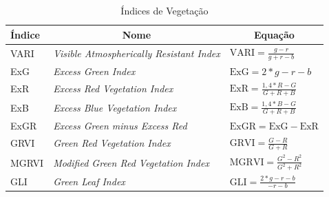 \documentclass[12pt, a4paper, english, brazil]{article}
\begin{document}
\begin{table}[htb]
    \centering
    \caption{Índices de Vegetação \cite{Lu_Zhou_2019}}
    \label{tab:iv}
    \begin{tabular}{@{}lll@{}}
        \toprule
        Índice & \multicolumn{1}{c}{Nome} & \multicolumn{1}{c}{Equação} \\ \midrule

        \multirow{2}{*}{VARI} & \multirow{2}{*}{\textit{Visible Atmospherically Resistant Index}} & \multirow{2}{*}{$\displaystyle \text{VARI} = \frac{g - r}{g + r - b} $} \\
        & & \\ \midrule

        \multirow{2}{*}{ExG} & \multirow{2}{*}{\textit{Excess Green Index}} & \multirow{2}{*}{$\displaystyle \text{ExG} = 2 * g - r - b$} \\
        & & \\ \midrule

        \multirow{2}{*}{ExR} & \multirow{2}{*}{\textit{Excess Red Vegetation Index}} & \multirow{2}{*}{$\displaystyle \text{ExR} = \frac{1,4 * R - G}{G + R + B} $ } \\
        & & \\ \midrule

        \multirow{2}{*}{ExB} & \multirow{2}{*}{\textit{Excess Blue Vegetation Index}} & \multirow{2}{*}{$\displaystyle \text{ExB} = \frac{1,4 * B - G}{G + R + B}$} \\
        & & \\ \midrule

        \multirow{2}{*}{ExGR} & \multirow{2}{*}{\textit{Excess Green minus Excess Red}} & \multirow{2}{*}{$\displaystyle \text{ExGR} = \text{ExG} - \text{ExR}$} \\
        & & \\ \midrule

        \multirow{2}{*}{GRVI} & \multirow{2}{*}{\textit{Green Red Vegetation Index}} & \multirow{2}{*}{$\displaystyle \text{GRVI} = \frac{G - R}{G + R}$} \\
        & & \\ \midrule

        \multirow{2}{*}{MGRVI} & \multirow{2}{*}{\textit{Modified Green Red Vegetation Index}} & \multirow{2}{*}{$\displaystyle \text{MGRVI} = \frac{G^2 - R^2}{G^2+R^2}$} \\
        & & \\ \midrule

        \multirow{2}{*}{GLI} & \multirow{2}{*}{\textit{Green Leaf Index}} & \multirow{2}{*}{$\displaystyle \text{GLI} = \frac{2 * g - r - b}{-r - b}$} \\
        & & \\ \midrule


\end{tabular}
\end{table}
\end{document}
